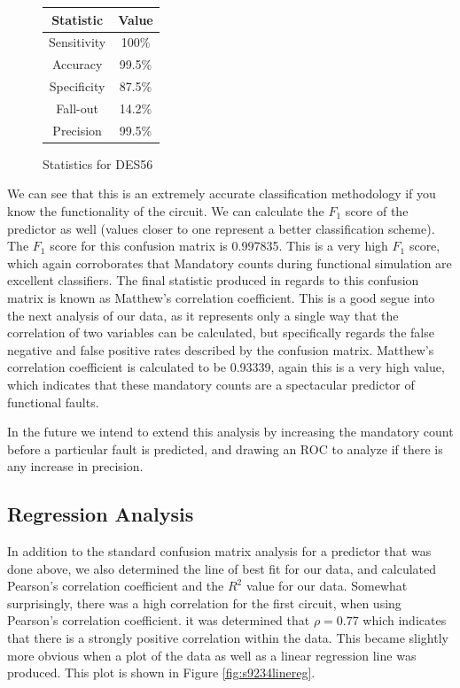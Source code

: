 \begin{figure}[h!]
\caption{Statistics for DES56\label{fig:statdes}}
\vspace{1 em}
\begin{center}
\begin{tabular}{| c | c |}
\hline
Statistic &  Value \\
\hline
\hline
Sensitivity & 100\% \\ 
\hline
Accuracy & 99.5\% \\ 
\hline
Specificity & 87.5\% \\ 
\hline
Fall-out & 14.2\% \\ 
\hline
Precision & 99.5\% \\
\hline
\end{tabular}
\end{center}
\end{figure}
    
    We can see that this is an extremely accurate classification methodology if you know the functionality of the circuit. 
    We can calculate the $F_1$ score of the predictor as well (values closer to one represent a better classification scheme).
    The $F_1$ score for this confusion matrix is 0.997835. 
    This is a very high $F_1$ score, which again corroborates that Mandatory counts during functional simulation are excellent classifiers. 
    The final statistic produced in regards to this confusion matrix is known as Matthew's correlation coefficient. 
    This is a good segue into the next analysis of our data, as it represents only a single way that the correlation of two variables can be calculated, but specifically regards the false negative and false positive rates described by the confusion matrix. 
    Matthew's correlation coefficient is calculated to be 0.93339, again this is a very high value, which indicates that these mandatory counts are a spectacular predictor of functional faults. 

    In the future we intend to extend this analysis by increasing the mandatory count before a particular fault is predicted, and drawing an ROC to analyze if there is any increase in precision.

\subsection{Regression Analysis}

    In addition to the standard confusion matrix analysis for a predictor that was done above, we also determined the line of best fit for our data, and calculated Pearson's correlation coefficient and the $R^2$ value for our data. 
    Somewhat surprisingly, there was a high correlation for the first circuit, when using Pearson's correlation coefficient. 
    it was determined that $\rho = 0.77$ which indicates that there is a strongly positive correlation within the data. 
    This became slightly more obvious when a plot of the data as well as a linear regression line was produced. 
    This plot is shown in Figure \ref{fig:s9234linereg}.

